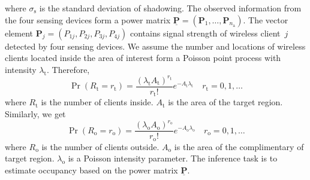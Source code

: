 where $\sigma_{\mathrm{s}}$ is the standard deviation of shadowing.
The observed information from the four sensing devices form a power matrix $\underline{\mathbf{P}} = (\mathbf{P}_1, \ldots, \mathbf{P}_{n_{\mathrm{a}}})$.
The vector element $\mathbf{P}_j = (P_{1j}, P_{2j},P_{3j},P_{4j})$ contains signal strength of wireless client~$j$ detected by four sensing devices.
We assume the number and locations of wireless clients located inside the area of interest form a Poisson point process with intensity $\lambda_{\mathrm{t}}$.
Therefore,
\begin{equation*}
\Pr ( R_{\mathrm{t}} = r_{\mathrm{t}} )
= \frac{(\lambda_{\mathrm{t}} A_{\mathrm{t}})^{r_{\mathrm{t}}}}
{r_{\mathrm{t}}!} e^{- A_{\mathrm{t}} \lambda_{\mathrm{t}}}
\quad r_{\mathrm{t}} = 0, 1, \ldots
\end{equation*}
where $R_{\mathrm{t}}$ is the number of clients inside.
$A_{\mathrm{t}}$ is the area of the target region.
Similarly, we get
\begin{equation*}
\Pr ( R_{\mathrm{o}} = r_{\mathrm{o}} )
= \frac{(\lambda_{\mathrm{o}} A_{\mathrm{o}})^{r_{\mathrm{o}}}}
{r_{\mathrm{o}}!} e^{- A_{\mathrm{o}} \lambda_{\mathrm{o}}}
\quad r_{\mathrm{o}} = 0, 1, \ldots
\end{equation*}
where $R_{\mathrm{o}}$ is the number of clients outside.
$A_{\mathrm{o}}$ is the area of the complimentary of target region.
$\lambda_{\mathrm{o}}$ is a Poisson intensity parameter.
The inference task is to estimate occupancy based on the power matrix $\underline{\mathbf{P}}$.
